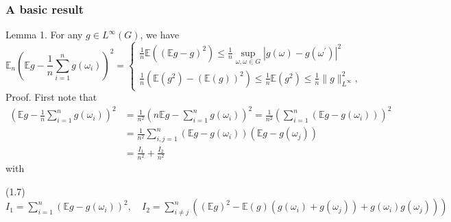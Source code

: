 \documentclass[10pt]{article}
\begin{document}
\subsubsection{A basic result}
Lemma 1. For any $g \in L^{\infty}(G)$, we have
$$
\mathbb{E}_{n}\left(\mathbb{E} g-\frac{1}{n} \sum_{i=1}^{n} g\left(\omega_{i}\right)\right)^{2}=\left\{\begin{array}{c}
\frac{1}{n} \mathbb{E}\left((\mathbb{E} g-g)^{2}\right) \leq \frac{1}{n} \sup _{\omega, \omega \in G}\left|g(\omega)-g\left(\omega^{\prime}\right)\right|^{2} \\
\frac{1}{n}\left(\mathbb{E}\left(g^{2}\right)-(\mathbb{E}(g))^{2}\right) \leq \frac{1}{n} \mathbb{E}\left(g^{2}\right) \leq \frac{1}{n}\|g\|_{L^{\infty}}^{2},
\end{array}\right.
$$
Proof. First note that
$$
\begin{aligned}
\left(\mathbb{E} g-\frac{1}{n} \sum_{i=1}^{n} g\left(\omega_{i}\right)\right)^{2} &=\frac{1}{n^{2}}\left(n \mathbb{E} g-\sum_{i=1}^{n} g\left(\omega_{i}\right)\right)^{2}=\frac{1}{n^{2}}\left(\sum_{i=1}^{n}\left(\mathbb{E} g-g\left(\omega_{i}\right)\right)\right)^{2} \\
&=\frac{1}{n^{2}} \sum_{i, j=1}^{n}\left(\mathbb{E} g-g\left(\omega_{i}\right)\right)\left(\mathbb{E} g-g\left(\omega_{j}\right)\right) \\
&=\frac{I_{1}}{n^{2}}+\frac{I_{2}}{n^{2}}
\end{aligned}
$$
with

(1.7) $\left.I_{1}=\sum_{i=1}^{n}\left(\mathbb{E} g-g\left(\omega_{i}\right)\right)^{2}, \quad I_{2}=\sum_{i \neq j}^{n}\left((\mathbb{E} g)^{2}-\mathbb{E}(g)\left(g\left(\omega_{i}\right)+g\left(\omega_{j}\right)\right)+g\left(\omega_{i}\right) g\left(\omega_{j}\right)\right)\right)$
\end{document}
